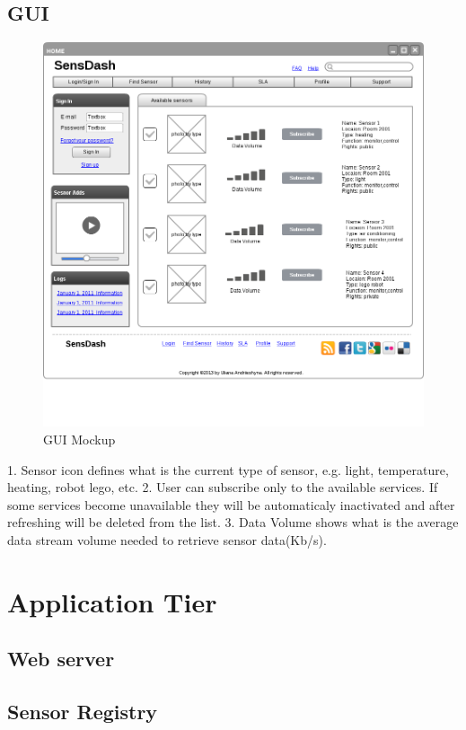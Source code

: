   \subsection{GUI}
  \begin{figure}[!ht]
  \centering
  \includegraphics[scale=0.5]{images/Mockup.png}   
  \caption[GUI Mockup]{GUI Mockup}
  \label{img:GUI Mockup}                           
  \end{figure}
  1. Sensor icon defines what is the current type of sensor, e.g. light, temperature, heating, robot lego, etc.
  2. User can subscribe only to the available services. If some services become unavailable they will be automaticaly inactivated and after refreshing will be deleted from the list.
  3. Data Volume shows what is the average data stream volume needed to retrieve sensor data(Kb/s).

\section{Application Tier}
	\subsection{Web server}
	\subsection{Sensor Registry}
